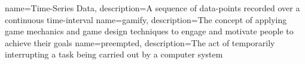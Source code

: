  {
  name=Time-Series Data, description={A sequence of data-points recorded over a
  continuous time-interval}
}
 {
  name=gamify, description={The concept of applying game mechanics and game
  design techniques to engage and motivate people to achieve their goals}
}
 {
  name=preempted, description={The act of temporarily interrupting a task being
  carried out by a computer system}
}
